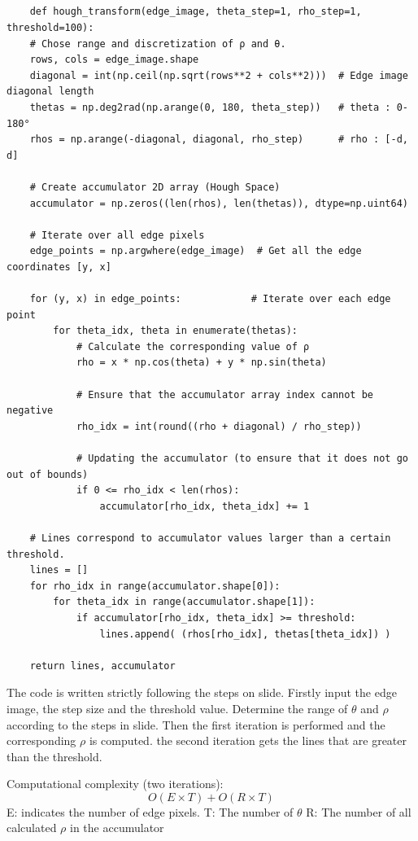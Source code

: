 \documentclass[12pt]{article}
\begin{document}
\subsection{}
\begin{lstlisting}
    def hough_transform(edge_image, theta_step=1, rho_step=1, threshold=100):
    # Chose range and discretization of ρ and θ.
    rows, cols = edge_image.shape
    diagonal = int(np.ceil(np.sqrt(rows**2 + cols**2)))  # Edge image diagonal length
    thetas = np.deg2rad(np.arange(0, 180, theta_step))   # theta : 0-180°
    rhos = np.arange(-diagonal, diagonal, rho_step)      # rho : [-d, d]
    
    # Create accumulator 2D array (Hough Space)
    accumulator = np.zeros((len(rhos), len(thetas)), dtype=np.uint64)
    
    # Iterate over all edge pixels
    edge_points = np.argwhere(edge_image)  # Get all the edge coordinates [y, x]
    
    for (y, x) in edge_points:            # Iterate over each edge point
        for theta_idx, theta in enumerate(thetas):  
            # Calculate the corresponding value of ρ
            rho = x * np.cos(theta) + y * np.sin(theta)
            
            # Ensure that the accumulator array index cannot be negative
            rho_idx = int(round((rho + diagonal) / rho_step))
            
            # Updating the accumulator (to ensure that it does not go out of bounds)
            if 0 <= rho_idx < len(rhos):
                accumulator[rho_idx, theta_idx] += 1
    
    # Lines correspond to accumulator values larger than a certain threshold.
    lines = []
    for rho_idx in range(accumulator.shape[0]):
        for theta_idx in range(accumulator.shape[1]):
            if accumulator[rho_idx, theta_idx] >= threshold:
                lines.append( (rhos[rho_idx], thetas[theta_idx]) )
    
    return lines, accumulator
\end{lstlisting}
The code is written strictly following the steps on slide.
Firstly input the edge image, the step size and the threshold value. Determine the range of $ \theta $ and $ \rho $ according to the steps in slide.
Then the first iteration is performed and the corresponding $ \rho $ is computed. the second iteration gets the lines that are greater than the threshold.


Computational complexity (two iterations): 
\[ O(E \times T) + O(R \times T) \]
E: indicates the number of edge pixels.
T: The number of $ \theta $
R: The number of all calculated $ \rho $ in the accumulator
\end{document}
